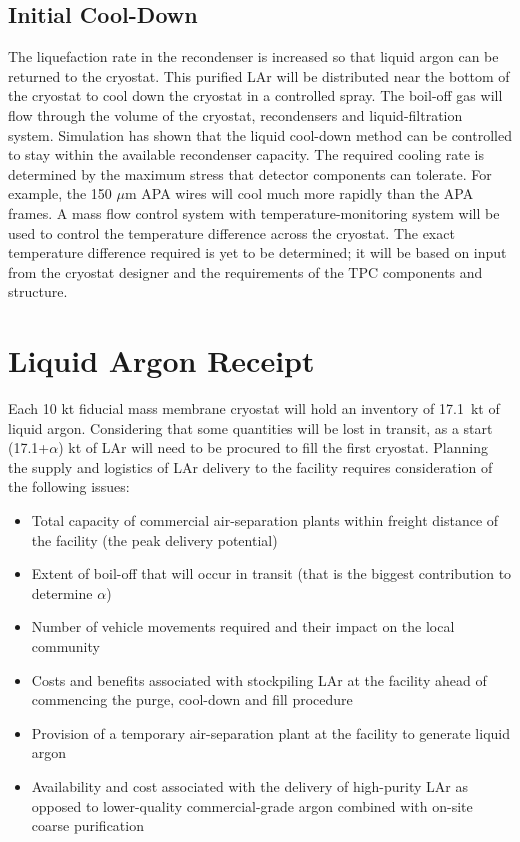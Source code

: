 \subsection{Initial Cool-Down}

The liquefaction rate in the recondenser is increased so that liquid argon can be returned to
the cryostat. This purified LAr will be distributed near
the bottom of the cryostat to cool down the cryostat in a controlled spray.
The boil-off gas will flow through the volume of the cryostat, recondensers
and liquid-filtration system. Simulation
has shown that the liquid cool-down method can
be controlled to stay within the available recondenser capacity. The required cooling rate
is determined by the maximum stress that detector components can
tolerate. For example, the 150 $\mu$m APA wires will cool much more rapidly than the APA frames.
A mass flow control system with temperature-monitoring system will be used to control the
temperature difference across the cryostat. The exact temperature difference required is yet to
be determined; it will be based on input from the cryostat designer and the requirements of
the TPC components and structure.


\section{Liquid Argon Receipt}

Each 10 kt fiducial mass membrane cryostat will hold an inventory 
of 17.1~kt of liquid argon. Considering that some quantities will 
be lost in transit, as a start (17.1+$\alpha$) kt of LAr will need to be 
procured to fill the first cryostat. Planning the supply and logistics 
of LAr delivery to the facility requires consideration of the following issues:

\begin{itemize}
\item  Total capacity of commercial air-separation plants within freight 
distance of the facility (the peak delivery potential)
\item Extent of boil-off that will occur in transit (that is the biggest 
contribution to determine $\alpha$)
\item Number of vehicle movements required and their impact on the local community
\item Costs and benefits associated with stockpiling LAr at the facility
ahead of commencing the purge, cool-down and fill procedure
\item Provision of a temporary air-separation plant at the facility 
to generate liquid argon
\item Availability and cost associated with the delivery of high-purity 
LAr as opposed to lower-quality commercial-grade argon combined with 
on-site coarse purification
\end{itemize}

